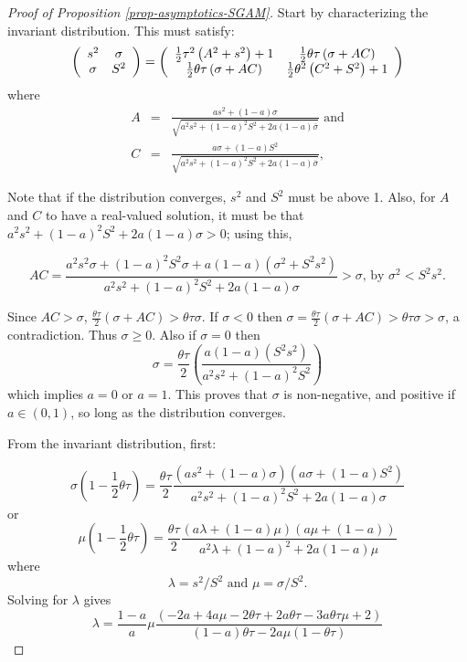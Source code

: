 \documentclass[
]{article}
\theoremstyle{definition}
\theoremstyle{definition}
\theoremstyle{definition}
\theoremstyle{definition}
\theoremstyle{remark}
\begin{document}
\begin{proof}[Proof of Proposition \ref{prop-asymptotics-SGAM}]
Start by characterizing the invariant distribution. This must satisfy:%
\[
\left( 
\begin{array}{cc}
s^{2} & \sigma \\ 
\sigma & S^{2}%
\end{array}%
\right) =\left( 
\begin{array}{cc}
\frac{1}{2}\tau ^{2}\left( A^{2}+s^{2}\right) +1 & \frac{1}{2}%
\theta \tau \left( \sigma+AC\right)  \\ 
\frac{1}{2}\theta \tau \left( \sigma+AC\right)  & \frac{1}{%
2}\theta ^{2}\left( C^{2}+S^{2}\right) +1%
\end{array}%
\right) \allowbreak 
\]%
where%
\begin{eqnarray*}
A &=&\frac{as^{2}+\left( 1-a\right) \sigma}{\sqrt{a^{2}%
s^{2}+\left( 1-a\right) ^{2}S^{2}+2a\left( 1-a\right) \bar{\sigma%
}}}\textrm{ \ and} \\
C &=&\frac{a\sigma+\left( 1-a\right) S^{2}}{\sqrt{a^{2}%
s^{2}+\left( 1-a\right) ^{2}S^{2}+2a\left( 1-a\right) \bar{\sigma%
}}},
\end{eqnarray*}%

Note that if the distribution converges, $s^{2}$ and $S^{2}$
must be above 1. Also, for $A$ and $C$ to have a real-valued
solution, it must be that $a^{2}s^{2}+(1-a)^{2}S^{2}+2a(1-a)\sigma>0$;
using this,

\[
AC=\frac{a^{2}s^{2}\sigma+(1-a)^{2}S^{2}\sigma+a(1-a)(\sigma^{2}+S^{2}s^{2})}{a^{2}s^{2}+(1-a)^{2}S^{2}+2a(1-a)\sigma}>\sigma\textrm{, by }\sigma^{2}<S^{2}s^{2}.
\]

Since $AC>\sigma$, $\frac{\theta\tau}{2}(\sigma+AC)>\theta\tau\sigma$.
If $\sigma<0$ then $\sigma=\frac{\theta\tau}{2}(\sigma+AC)>\theta\tau\sigma>\sigma$,
a contradiction. Thus $\sigma\ge0$. Also if $\sigma=0$
then 
\[
\sigma=\frac{\theta\tau}{2}\left(\frac{a(1-a)(S^{2}s^{2})}{a^{2}s^{2}+(1-a)^{2}S^{2}}\right)
\]
which implies $a=0$ or $a=1$. This proves that $\sigma$ is
non-negative, and positive if $a\in(0,1)$, so long as the distribution
converges.

From the invariant distribution, first:

\[
\sigma\left(1-\frac{1}{2}\theta\tau\right)=\frac{\theta\tau}{2}\frac{\left(as^{2}+\left(1-a\right)\sigma\right)\left(a\sigma+\left(1-a\right)S^{2}\right)}{a^{2}s^{2}+\left(1-a\right)^{2}S^{2}+2a\left(1-a\right)\sigma}
\]
or
\[
\mu\left(1-\frac{1}{2}\theta\tau\right)=\frac{\theta\tau}{2}\frac{\left(a\lambda+\left(1-a\right)\mu\right)\left(a\mu+\left(1-a\right)\right)}{a^{2}\lambda+\left(1-a\right)^{2}+2a\left(1-a\right)\mu}
\]
where
\[
\lambda=s^{2}/S^{2}\text{ and }\mu=\sigma/S^{2}.
\]
Solving for $\lambda$ gives
\begin{equation}
\lambda=\frac{1-a}{a}\mu\frac{\left(-2a+4a\mu-2\theta\tau+2a\theta\tau-3a\theta\tau\mu+2\right)\allowbreak}{\left(1-a\right)\theta\tau-2a\mu\left(1-\theta\tau\right)}\label{L}
\end{equation}


\end{proof}
\end{document}
